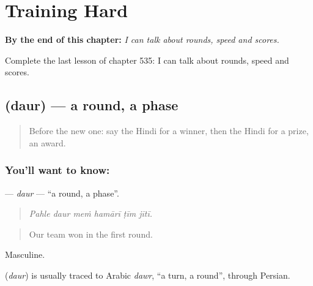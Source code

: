 
\chapter{Training Hard}
\label{ch:hi-training-hard}

\begin{chapteropening}
\textbf{By the end of this chapter:} \emph{I can talk about rounds, speed and scores.}

Complete the last lesson of chapter 535: I can talk about rounds, speed and scores.
\end{chapteropening}

\section[\texorpdfstring{\hi{दौर} (daur)}{दौर (daur)}]{ (daur) — a round, a phase}

\label{lesson:HI-C535-daur}



\begin{quote}
Before the new one: say the Hindi for a winner, then the Hindi for a prize, an award.
\end{quote}

\subsection*{You'll want to know: }
\textbf{} — \emph{daur} — \textquotedblleft{}a round, a phase\textquotedblright{}.

\begin{quote}
     
\end{quote}

\begin{quote}
\emph{Pahle daur meṁ hamārī ṭīm jītī.}
\end{quote}

\begin{quote}
Our team won in the first round.
\end{quote}

Masculine.

\begin{cousinweb}
\textbf{} (\emph{daur}) is usually traced to Arabic \emph{dawr}, \textquotedblleft{}a turn, a round\textquotedblright{}, through Persian.
\end{cousinweb}

